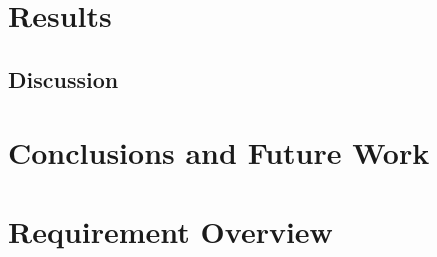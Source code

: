 \documentclass[a4paper,11pt]{kth-mag}
\begin{document}

\chapter{Results}

\section{Discussion}


\chapter{Conclusions and Future Work}

%
\appendix
\addappheadtotoc
\chapter{Requirement Overview}\label{app:A}
\end{document}
